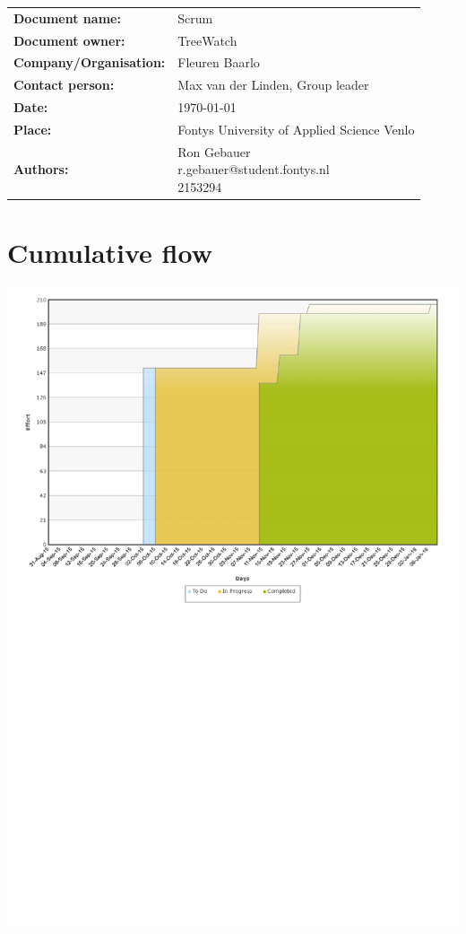\documentclass[12pt]{article}
\begin{document}
		\begin{tabular}{ll}
			\textbf{Document name:} & Scrum\\
			\textbf{Document owner:} & TreeWatch \\
			\textbf{Company/Organisation:} & Fleuren Baarlo \\
			\textbf{Contact person:} & Max van der Linden, Group leader \\
			\textbf{Date:} & \today \\
			\textbf{Place:} & Fontys University of Applied Science Venlo \\
			\textbf{Authors:} & \parbox[t]{5cm}{
			Ron Gebauer\\ r.gebauer@student.fontys.nl\\ 2153294 \\ }
		\end{tabular}
		\clearpage

	\tableofcontents
	\clearpage

	\section{Cumulative flow}
		\includegraphics[width=1.25\textwidth,angle=90]{cumulativeflow}
		\clearpage
	
\end{document}
